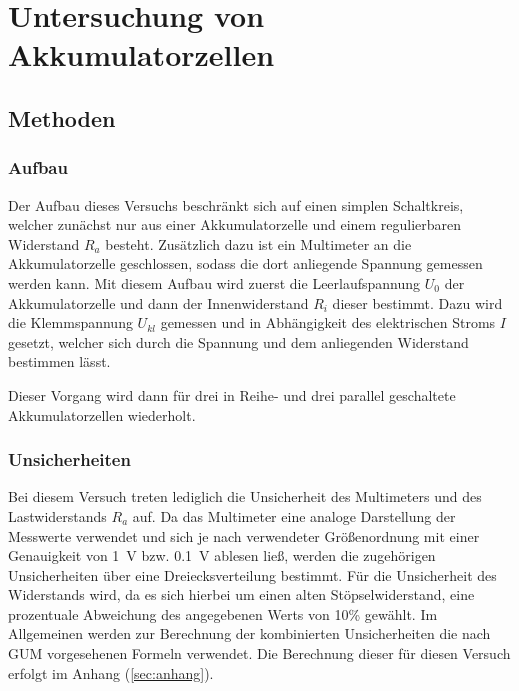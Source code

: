 \section{Untersuchung von Akkumulatorzellen} 



\subsection{Methoden}

\subsubsection{Aufbau}

Der Aufbau dieses Versuchs beschränkt sich auf einen simplen Schaltkreis, welcher zunächst nur aus einer Akkumulatorzelle und einem regulierbaren Widerstand $R_a$ besteht. 
Zusätzlich dazu ist ein Multimeter an die Akkumulatorzelle geschlossen, sodass die dort anliegende Spannung gemessen werden kann. 
Mit diesem Aufbau wird zuerst die Leerlaufspannung $U_0$ der Akkumulatorzelle und dann der Innenwiderstand $R_i$ dieser bestimmt.
Dazu wird die Klemmspannung $U_{kl}$ gemessen und in Abhängigkeit des elektrischen Stroms $I$ gesetzt, welcher sich durch die Spannung und dem anliegenden Widerstand bestimmen lässt.

Dieser Vorgang wird dann für drei in Reihe- und drei parallel geschaltete Akkumulatorzellen wiederholt. 

\subsubsection{Unsicherheiten}

Bei diesem Versuch treten lediglich die Unsicherheit des Multimeters und des Lastwiderstands $R_a$ auf. 
Da das Multimeter eine analoge Darstellung der Messwerte verwendet und sich je nach verwendeter Größenordnung mit einer Genauigkeit von \SI{1}{V} bzw. \SI{0,1}{V} ablesen ließ, werden die zugehörigen Unsicherheiten über eine Dreiecksverteilung bestimmt.
Für die Unsicherheit des Widerstands wird, da es sich hierbei um einen alten Stöpselwiderstand, eine prozentuale Abweichung des angegebenen Werts von 10\% gewählt.
Im Allgemeinen werden zur Berechnung der kombinierten Unsicherheiten die nach GUM vorgesehenen Formeln verwendet. 
Die Berechnung dieser für diesen Versuch erfolgt im Anhang (\ref*{sec:anhang}).

